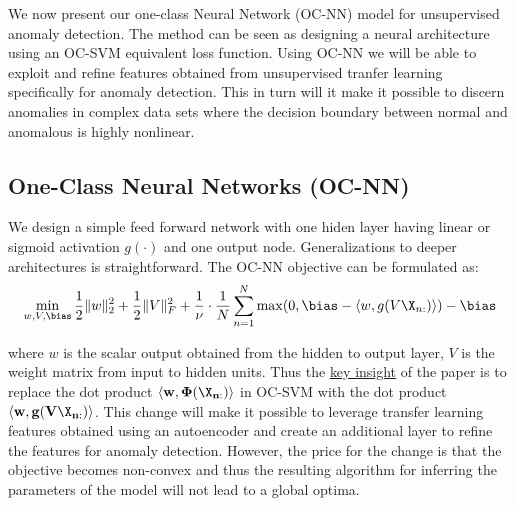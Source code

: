 
We now present our one-class Neural Network (OC-NN) model for unsupervised anomaly detection.
The method can be seen as designing a neural architecture using an  OC-SVM equivalent loss function.
Using OC-NN we will be able to exploit and refine features obtained from unsupervised tranfer learning specifically for anomaly
detection. This in turn will it make it possible to discern anomalies in complex data sets where the decision boundary between normal and anomalous
is highly nonlinear.
\vspace{-0.1cm}
\subsection{One-Class Neural Networks (OC-NN)}
\label{sec:oc-nn}
We design a simple feed forward network with one hiden layer having linear or sigmoid activation $g(\cdot )$ and one output node. Generalizations to deeper
architectures is straightforward. The OC-NN objective can be formulated as:
\begin{equation}
	\label{eqn:oc-nn}
	\min_{w, V, \bias} \frac{1}{2} \| w \|_{2}^2 + \frac{1}{2} \| V \|_F^2 + \frac{1}{\nu} \cdot \frac{1}{N} \sum_{n= 1}^N \max( 0, \bias - \langle w, g( V  \X_{n :} ) \rangle ) - \bias
\end{equation}

where $w$ is the scalar output obtained from the hidden to output layer,
$V$ is the weight matrix from input to hidden units.
Thus the \underline{key insight} of the paper is to replace the dot product $\mathbf{\langle w,\Phi(\X_{n :}) \rangle}$ in OC-SVM with the dot product $\mathbf{\langle w,g(V\X_{n :})\rangle}$. This change will make it possible to leverage transfer learning features obtained using an autoencoder and create an additional layer to refine
the features for anomaly detection. However, the price for the change is that the objective becomes non-convex and thus the resulting algorithm
for inferring the parameters of the model will not lead to a global optima.



